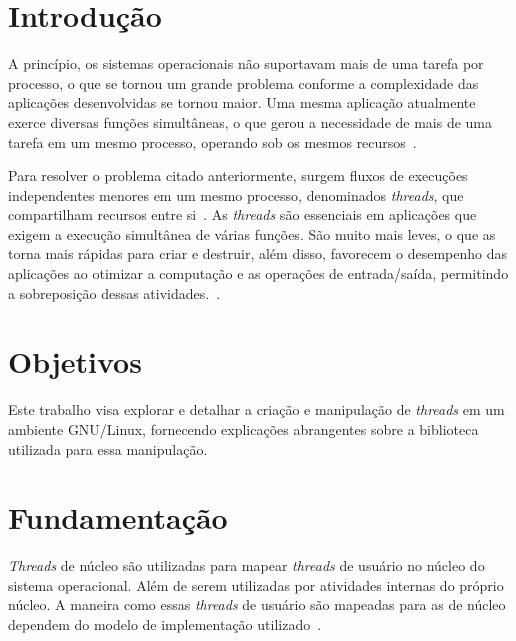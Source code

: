 \documentclass[
	12pt,				%
	oneside,   	        %
	a4paper,			%
	english,			%
	french,				%
	spanish,			%
	brazil,				%
	]{pacotes/abntex2}
\begin{document}
\textual

\makeatletter
\renewcommand{\chapter}{\@gobbletwo}
\makeatother

\section{Introdução}
\label{sec:introducao}
A princípio, os sistemas operacionais não suportavam mais de uma tarefa por processo, o que se tornou um grande problema conforme a complexidade das aplicações desenvolvidas se tornou maior. Uma mesma aplicação atualmente exerce diversas funções simultâneas, o que gerou a necessidade de mais de uma tarefa em um mesmo processo, operando sob os mesmos recursos~\cite{maziero2019}.

Para resolver o problema citado anteriormente, surgem fluxos de execuções independentes menores em um mesmo processo, denominados \textit{threads}, que compartilham recursos entre si~\cite{maziero2019}. As \textit{threads} são essenciais em aplicações que exigem a execução simultânea de várias funções. São muito mais leves, o que as torna mais rápidas para criar e destruir, além disso, favorecem o desempenho das aplicações ao otimizar a computação e as operações de entrada/saída, permitindo a sobreposição dessas atividades.~\cite{tanenbaum2016}. 

\section{Objetivos}
\label{sec:objetivos}

Este trabalho visa explorar e detalhar a criação e manipulação de \textit{threads} em um ambiente GNU/Linux, fornecendo explicações abrangentes sobre a biblioteca utilizada para essa manipulação.

\section{Fundamentação}
\label{sec:fundamentacao}
\textit{Threads} de núcleo são utilizadas para mapear \textit{threads} de usuário no núcleo do sistema operacional. Além de serem utilizadas por atividades internas do próprio núcleo. A maneira como essas \textit{threads} de usuário são mapeadas para as de núcleo dependem do modelo de implementação utilizado~\cite{maziero2019}.
\end{document}
